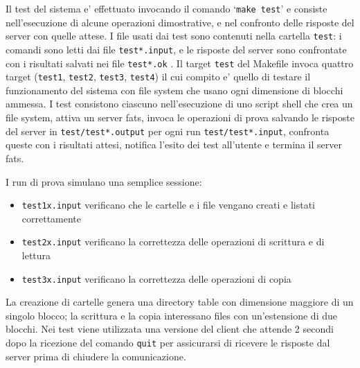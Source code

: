 \documentclass[11pt,oneside,a4paper]{article}
\begin{document}
Il test del sistema e' effettuato invocando il comando `\texttt{make test}' e consiste nell'esecuzione di alcune operazioni dimostrative, e nel confronto delle risposte del server con quelle attese. I file usati dai test sono contenuti nella cartella \texttt{test}: i comandi sono letti dai file \texttt{test*.input}, e le risposte del server sono confrontate con i risultati salvati nei file \texttt{test*.ok} . Il target \texttt{test} del Makefile invoca quattro target (\texttt{test1}, \texttt{test2}, \texttt{test3}, \texttt{test4}) il cui compito e' quello di testare il funzionamento del sistema con file system che usano ogni dimensione di blocchi ammessa. I test consistono ciascuno nell'esecuzione di uno script shell che crea un file system, attiva un server fats, invoca le operazioni di prova salvando le risposte del server in \texttt{test/test*.output} per ogni run \texttt{test/test*.input}, confronta queste con i risultati attesi, notifica l'esito dei test all'utente e termina il server fats.

I run di prova simulano una semplice sessione:
\begin{itemize}
  \item \texttt{test1x.input} verificano che le cartelle e i file vengano creati e listati correttamente
  \item \texttt{test2x.input} verificano la correttezza delle operazioni di scrittura e di lettura
  \item \texttt{test3x.input} verificano la correttezza delle operazioni di copia
\end{itemize}

La creazione di cartelle genera una directory table con dimensione maggiore di un singolo blocco; la scrittura e la copia interessano files con un'estensione di due blocchi. Nei test viene utilizzata una versione del client che attende 2 secondi dopo la ricezione del comando \texttt{quit} per assicurarsi di ricevere le risposte dal server prima di chiudere la comunicazione.

\end{document}
